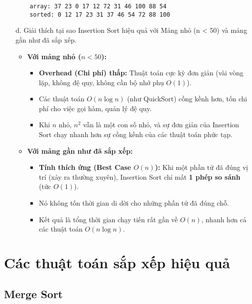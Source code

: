 \documentclass[12pt,a4paper]{article}
\begin{document}
\begin{enumerate}
    \begin{verbatim}
    array: 37 23 0 17 12 72 31 46 100 88 54
    sorted: 0 12 17 23 31 37 46 54 72 88 100
    \end{verbatim}

    \item[d.] Giải thích tại sao Insertion Sort hiệu quả với Mảng nhỏ 
              (n < 50) và mảng gần như đã sắp xếp.
    \begin{itemize}
        \item \textbf{Với mảng nhỏ ($n < 50$):}
        \begin{itemize}
            \item \textbf{Overhead (Chi phí) thấp:} Thuật toán cực kỳ đơn giản 
            (vài vòng lặp, không đệ quy, không cần bộ nhớ phụ $O(1)$).
            \item Các thuật toán $O(n \log n)$ (như QuickSort) cồng kềnh hơn, 
            tốn chi phí cho việc gọi hàm, quản lý đệ quy.
            \item Khi $n$ nhỏ, $n^2$ vẫn là một con số nhỏ, 
            và sự đơn giản của Insertion Sort chạy nhanh hơn sự cồng kềnh 
            của các thuật toán phức tạp.
        \end{itemize}
        
        \item \textbf{Với mảng gần như đã sắp xếp:}
        \begin{itemize}
            \item \textbf{Tính thích ứng (Best Case $O(n)$):} Khi một phần tử đã đúng vị trí 
            (xảy ra thường xuyên), Insertion Sort chỉ mất \textbf{1 phép so sánh} (tức $O(1)$).
            \item Nó không tốn thời gian di dời cho những phần tử đã đúng chỗ.
            \item Kết quả là tổng thời gian chạy tiến rất gần về $O(n)$, 
            nhanh hơn cả các thuật toán $O(n \log n)$.
        \end{itemize}
    \end{itemize}
\end{enumerate}

\section{Các thuật toán sắp xếp hiệu quả}
\subsection{Merge Sort}
\end{document}

